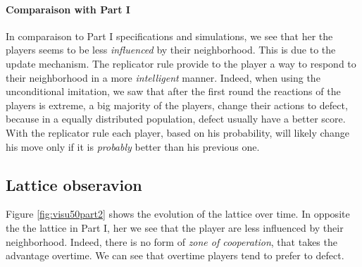 \documentclass[letterpaper]{article}
\begin{document}
\paragraph{Comparaison with Part I}

In comparaison to Part I specifications and simulations, we see that her
the players seems to be less \textit{influenced} by their neighborhood.
This is due to the update mechanism. The replicator rule provide to the player
a way to respond to their neighborhood in a more \textit{intelligent} manner.
Indeed, when using the unconditional imitation, we saw that after the first
round the reactions of the players is extreme, a big majority of the players,
change their actions to defect, because in a equally distributed population,
defect usually have a better score. With the replicator rule each player,
based on his probability, will likely change his move only if it is
\textit{probably} better than his previous one.


\subsection{Lattice obseravion}

Figure \ref{fig:visu50part2} shows the evolution of the lattice over time.
In opposite the the lattice in Part I, her we see that the player are less
influenced by their neighborhood. Indeed, there is no form of
\textit{zone of cooperation}, that takes the advantage overtime.
We can see that overtime players tend to prefer to defect.
\end{document}
